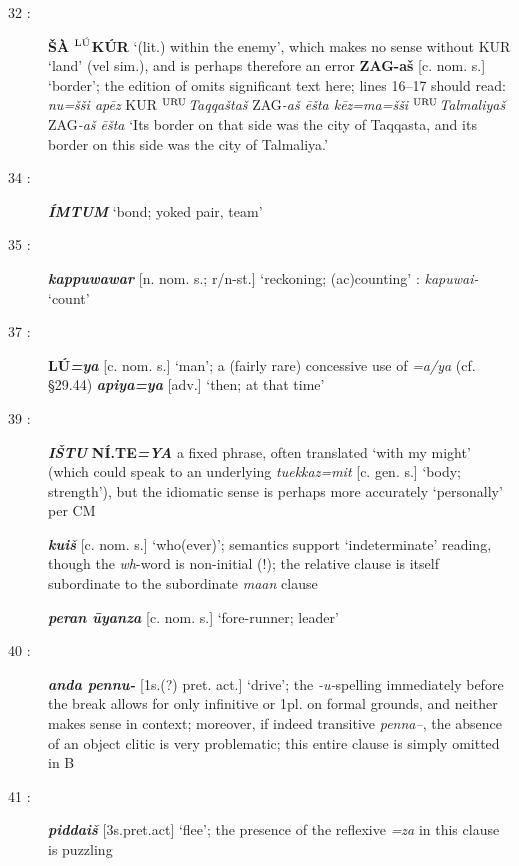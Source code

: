 \documentclass[10pt]{article}
\newcommand{\supersc}[1]{$^{\textrm{\scriptsize{#1}}}$}  	%
\newcommand{\bit}[1]{\textbf{\textit{#1}}}				%
\newcommand{\p}[1]{{\tiny[{#1}]}}					%
\newcommand{\hith}{\textsubwedge{h}}
\newcommand{\man}{\supersc{L\'U}}
\newcommand{\city}{\supersc{URU}}
\renewcommand{\.}[1]{\textsubdot{#1}}
\begin{document}
\begin{description}
\item[32 :] {\bf \v{S}\`A {\man}K\'UR} `(lit.) within the enemy', which makes no sense without KUR `land' (vel sim.), and is perhaps therefore an error \textbf{ZAG-a\v{s}} \p{c. nom. s.} `border'; the edition of \citet[12]{otten1981hattusili} omits significant text here; lines 16--17 should read: \textit{nu=\v{s}\v{s}i ap\=ez} KUR {\city}\textit{Taqqa\v{s}ta\v{s}} ZAG\textit{-a\v{s} \=e\v{s}ta k\=ez=ma=\v{s}\v{s}i} {\city}\textit{Talmaliya\v{s}} ZAG\textit{-a\v{s} \=e\v{s}ta} `Its border on that side was the city of Taqqasta, and its border on this side was the city of Talmaliya.'

\item[34 :] \bit{\'IMTUM} `bond; yoked pair, team'

\item[35 :] \bit{kappuwawar} \p{n. nom. s.; r/n-st.} `reckoning; (ac)counting' : \textit{kapuwai-} `count' 

\item[37 :] \textbf{L\'U}\bit{=ya} \p{c. nom. s.} `man'; a (fairly rare) concessive use of \textit{=a/ya} (cf.  \S29.44) \bit{apiya=ya} \p{adv.} `then; at that time'

\item[39 :] \bit{I\v{S}TU} \textbf{N\'I.TE}\bit{=YA} a fixed phrase, often translated `with my might' (which could speak to an underlying \textit{tuekkaz=mit} \p{c. gen. s.} `body; strength'), but the idiomatic sense is perhaps more accurately `personally' per CM

\bit{kui\v{s}} \p{c. nom. s.} `who(ever)'; semantics support `indeterminate' reading, though the \textit{wh}-word is non-initial  (!); the relative clause is itself subordinate to the subordinate \textit{ma{\hith}{\hith}an} clause  

\bit{peran {\hith}\=uyanza} \p{c. nom. s.} `fore-runner; leader'

\item[40 :] \bit{anda pennu-} \p{1s.(?) pret. act.} `drive'; the \textit{-u-}spelling immediately before the break allows for only infinitive or 1pl. on formal grounds, and neither makes sense in context; moreover, if indeed transitive \textit{penna--}, the absence of an object clitic is very problematic; this entire clause is simply omitted in B

\item[41 :] \bit{piddai\v{s}} \p{3s.pret.act} `flee'; the presence of the reflexive \textit{=za} in this clause is puzzling


\end{description}
\end{document}
